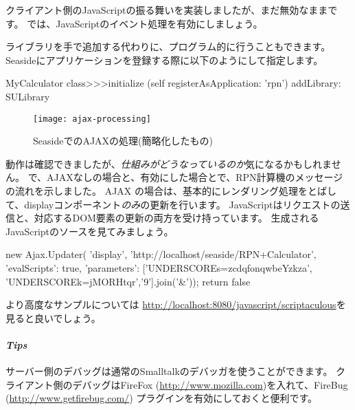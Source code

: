 \documentclass[a4paper,10pt,twoside]{book}
\begin{document}
クライアント側のJavaScriptの振る舞いを実装しましたが、まだ無効なままです。
では、JavaScriptのイベント処理を有効にしましょう。



ライブラリを手で追加する代わりに、プログラム的に行うこともできます。Seasideにアプリケーションを登録する際に以下のようにして指定します。
\begin{code}{}
MyCalculator class>>>initialize
	(self registerAsApplication: 'rpn')
		addLibrary: SULibrary
\end{code}

\begin{figure}[ht]
\begin{center}
\texttt{[image: ajax-processing]}
\caption{SeasideでのAJAXの処理(簡略化したもの)}
\end{center}
\end{figure}


動作は確認できましたが、\emph{仕組みがどうなっているのか}気になるかもしれません。
で、AJAXなしの場合と、有効にした場合とで、RPN計算機のメッセージの流れを示しました。
AJAX の場合は、基本的にレンダリング処理をとばして、displayコンポーネント\emph{のみ}の更新を行います。
JavaScriptはリクエストの送信と、対応するDOM要素の更新の両方を受け持っています。
生成されるJavaScriptのソースを見てみましょう。

\begin{code}{}
new Ajax.Updater(
	'display',
	'http://localhost/seaside/RPN+Calculator',
	{'evalScripts': true,
	  'parameters': ['UNDERSCOREs=zcdqfonqwbeYzkza', 'UNDERSCOREk=jMORHtqr','9'].join('&')});
return false
\end{code}

より高度なサンプルについては \url{http://localhost:8080/javascript/scriptaculous}を見ると良いでしょう。

\paragraph{\emph{Tips}}
サーバー側のデバッグは通常のSmalltalkのデバッガを使うことができます。
クライアント側のデバッグはFireFox (\url{http://www.mozilla.com})を入れて、FireBug (\url{http://www.getfirebug.com/}) プラグインを有効にしておくと便利です。
\end{document}
